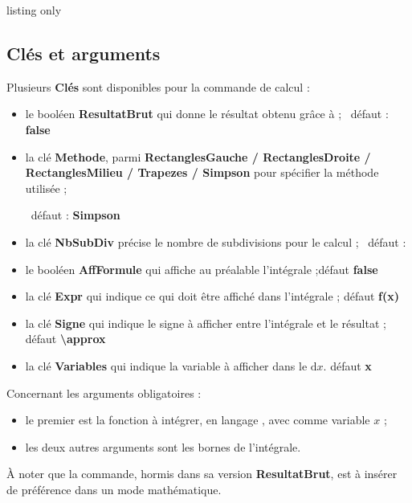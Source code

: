 \documentclass[a4paper,french,11pt]{article}
\newcommand\ctex[1]{\tcbox[vignettelatex]{#1}}
\newcommand\Cle[1]{{\bfseries\sffamily\textlangle #1\textrangle}}
\begin{document}
\begin{PresCodeTexPL}{listing only}
\end{PresCodeTexPL}

\subsection{Clés et arguments}

\begin{cautionblock}
Plusieurs \Cle{Clés} sont disponibles pour la commande de calcul :

\begin{itemize}
	\item le booléen \Cle{ResultatBrut} qui donne le résultat obtenu grâce à \ctex{xint} ; \hfill~défaut : \Cle{false}
	\item la clé \Cle{Methode}, parmi \Cle{RectanglesGauche / RectanglesDroite / RectanglesMilieu / Trapezes / Simpson} pour spécifier la méthode utilisée ;
	
	\hfill~défaut : \Cle{Simpson}
	\item la clé \Cle{NbSubDiv} précise le nombre de subdivisions pour le calcul ; \hfill~défaut : \Cle{10}
	\item le booléen \Cle{AffFormule} qui affiche au préalable l'intégrale ;\hfill{}défaut \Cle{false}
	\item la clé \Cle{Expr} qui indique ce qui doit être affiché dans l'intégrale ; \hfill{}défaut \Cle{f(x)}
	\item la clé \Cle{Signe} qui indique le signe à afficher entre l'intégrale et le résultat ; \hfill{}défaut \Cle{\textbackslash approx}
	\item la clé \Cle{Variables} qui indique la variable à afficher dans le $\text{d}x$. \hfill{}défaut \Cle{x}
\end{itemize}

\smallskip

Concernant les arguments obligatoires :

\begin{itemize}
	\item le premier est la fonction à intégrer, en langage \ctex{xint}, avec comme variable $x$ ;
	\item les deux autres arguments sont les bornes de l'intégrale.
\end{itemize}

À noter que la commande, hormis dans sa version \Cle{ResultatBrut}, est à insérer de préférence dans un mode mathématique.
\end{cautionblock}
\end{document}
